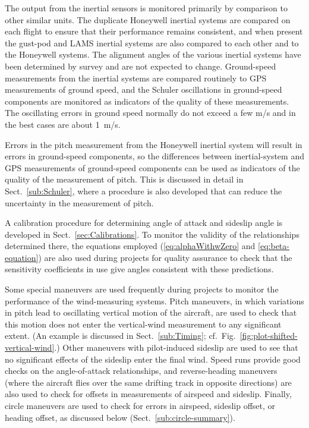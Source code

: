 \documentclass[12pt,twoside,english]{article}\usepackage[]{graphicx}\usepackage[]{color}
\let\OrgIndex\index
\renewcommand*{\index}[1]{\OrgIndex{#1}}
\begin{document}
{{
The output from the inertial sensors is monitored primarily by comparison to other similar units. The duplicate Honeywell inertial systems are compared on each flight to ensure that their performance remains consistent, and when present the gust-pod and LAMS inertial systems are also compared to each other and to the Honeywell systems. The alignment angles of the various inertial systems have been determined by survey and are not expected to change. Ground-speed measurements from the inertial systems are compared routinely to GPS measurements of ground speed, and the Schuler oscillations in ground-speed components are monitored as indicators of the quality of these measurements. The oscillating errors in ground speed normally do not exceed a few m/s and in the best cases are about 1~m/s.

Errors in the pitch measurement from the Honeywell inertial system will result in errors in ground-speed components, so the differences between inertial-system and GPS measurements of ground-speed components can be used as indicators of the quality of the measurement of pitch. This is discussed in detail in Sect.~\ref{sub:Schuler}, where a procedure is also developed that can reduce the uncertainty in the measurement of pitch. 

A calibration procedure for determining angle of attack and sideslip angle is developed in Sect.~\ref{sec:Calibrations}. To monitor the validity of the relationships determined there, the equations employed (\eqref{eq:alphaWithwZero} and \eqref{eq:beta-equation}) are also used during projects for quality assurance to check that the sensitivity coefficients in use give angles consistent with these predictions.

Some special maneuvers are used frequently during projects to monitor the performance of the wind-measuring systems. Pitch maneuvers, in which variations in pitch lead to oscillating vertical motion of the aircraft, are used to check that this motion does not enter the vertical-wind measurement to any significant extent. (An example is discussed in Sect.~\ref{sub:Timing}; cf.~Fig.~\ref{fig:plot-shifted-vertical-wind}.) Other maneuvers with pilot-induced sideslip are used to see that no significant effects of the sideslip enter the final wind. Speed runs provide good checks on the angle-of-attack relationships, and reverse-heading maneuvers (where the aircraft flies over the same drifting track in opposite directions) are also used to check for offsets in measurements of airspeed and sideslip. Finally, circle maneuvers are used to check for errors in airspeed, sideslip offset, or heading offset, as discussed below (Sect.~\ref{sub:circle-summary}). 


}}
\end{document}
